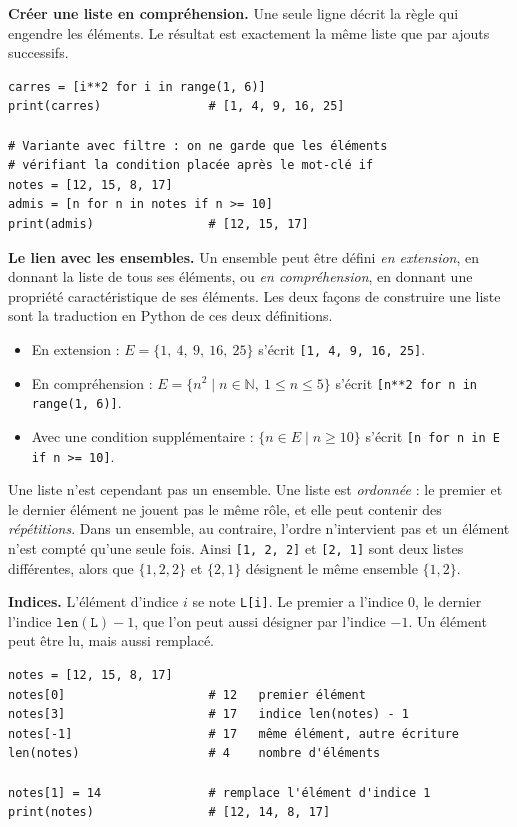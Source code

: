 \textbf{Créer une liste en compréhension.}
Une seule ligne décrit la règle qui engendre les éléments. Le résultat est
exactement la même liste que par ajouts successifs.

\begin{verbatim}
carres = [i**2 for i in range(1, 6)]
print(carres)               # [1, 4, 9, 16, 25]

# Variante avec filtre : on ne garde que les éléments
# vérifiant la condition placée après le mot-clé if
notes = [12, 15, 8, 17]
admis = [n for n in notes if n >= 10]
print(admis)                # [12, 15, 17]
\end{verbatim}

\textbf{Le lien avec les ensembles.}
Un ensemble peut être défini \emph{en extension}, en donnant la liste de tous
ses éléments, ou \emph{en compréhension}, en donnant une propriété
caractéristique de ses éléments. Les deux façons de construire une liste sont
la traduction en Python de ces deux définitions.

\begin{itemize}
  \item En extension : $E = \{1,\ 4,\ 9,\ 16,\ 25\}$ s'écrit
        \verb|[1, 4, 9, 16, 25]|.
  \item En compréhension : $E = \{n^2 \mid n \in \mathbb{N},\
        1 \leqslant n \leqslant 5\}$ s'écrit
        \verb|[n**2 for n in range(1, 6)]|.
  \item Avec une condition supplémentaire : $\{n \in E \mid n \geqslant 10\}$
        s'écrit \verb|[n for n in E if n >= 10]|.
\end{itemize}

Une liste n'est cependant pas un ensemble. Une liste est \emph{ordonnée} : le
premier et le dernier élément ne jouent pas le même rôle, et elle peut
contenir des \emph{répétitions}. Dans un ensemble, au contraire, l'ordre
n'intervient pas et un élément n'est compté qu'une seule fois. Ainsi
\verb|[1, 2, 2]| et \verb|[2, 1]| sont deux listes différentes, alors que
$\{1, 2, 2\}$ et $\{2, 1\}$ désignent le même ensemble $\{1, 2\}$.

\textbf{Indices.}
L'élément d'indice $i$ se note \verb|L[i]|. Le premier a l'indice 0, le
dernier l'indice $\mathtt{len(L)} - 1$, que l'on peut aussi désigner par
l'indice $-1$. Un élément peut être lu, mais aussi remplacé.

\begin{verbatim}
notes = [12, 15, 8, 17]
notes[0]                    # 12   premier élément
notes[3]                    # 17   indice len(notes) - 1
notes[-1]                   # 17   même élément, autre écriture
len(notes)                  # 4    nombre d'éléments

notes[1] = 14               # remplace l'élément d'indice 1
print(notes)                # [12, 14, 8, 17]
\end{verbatim}

